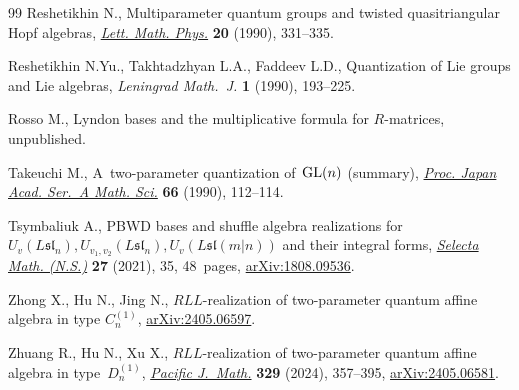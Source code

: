 \documentclass[10pt,a4paper]{amsart}
\numberwithin{equation}{section}
\begin{document}
\begin{thebibliography}{99}
Reshetikhin N., Multiparameter quantum groups and twisted quasitriangular
 {H}opf algebras, \href{https://doi.org/10.1007/BF00626530}{\textit{Lett.
 Math. Phys.}} \textbf{20} (1990), 331--335.

Reshetikhin N.Yu., Takhtadzhyan L.A., Faddeev L.D., Quantization of {L}ie groups
 and {L}ie algebras, \textit{Leningrad Math.~J.} \textbf{1} (1990), 193--225.

Rosso M., Lyndon bases and the multiplicative formula for $R$-matrices,
 {u}npublished.

Takeuchi M., A~two-parameter quantization of~{${\rm GL}(n)$} (summary),
 \href{https://doi.org/10.3792/pjaa.66.112}{\textit{Proc. Japan Acad. Ser.~A
 Math. Sci.}} \textbf{66} (1990), 112--114.

Tsymbaliuk A., P{BWD} bases and shuffle algebra realizations for
 {$U_v(L\mathfrak{sl}_n), U_{v_1, v_2}(L\mathfrak{sl}_n),
 U_v(L\mathfrak{sl}(m|n))$} and their integral forms,
 \href{https://doi.org/10.1007/s00029-021-00634-5}{\textit{Selecta Math.
 (N.S.)}} \textbf{27} (2021), 35, 48~pages,
 \href{http://arxiv.org/abs/1808.09536}{arXiv:1808.09536}.

Zhong X., Hu N., Jing N., $RLL$-realization of two-parameter quantum affine
 algebra in type $C^{(1)}_n$,
 \href{http://arxiv.org/abs/2405.06597}{arXiv:2405.06597}.

Zhuang R., Hu N., Xu X., {$RLL$}-realization of two-parameter quantum affine
 algebra in type~{$D_n^{(1)}$},
 \href{https://doi.org/10.2140/pjm.2024.329.357}{\textit{Pacific J.~Math.}}
 \textbf{329} (2024), 357--395,
 \href{http://arxiv.org/abs/2405.06581}{arXiv:2405.06581}.

\end{thebibliography}
\end{document}
